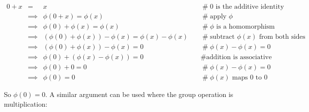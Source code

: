 \documentclass[11pt, oneside]{article}   	%
\theoremstyle{definition}
\begin{document}
\begin{equation*}
\begin{array}{rcll}
0 + x 
&=& x                                                                              &\quad \mathrel{\#} \text{$0$ is the additive identity}   \\
&\implies& \phi(0  + x) = \phi(x)                                      &\quad \mathrel{\#} \text{apply $\phi$}          \\
&\implies& \phi(0) +  \phi(x) = \phi(x)                              &\quad \mathrel{\#} \phi \text{ is a homomorphism}          \\
&\implies& (\phi(0) + \phi(x)) - \phi(x) = \phi(x) -\phi(x)   &\quad \mathrel{\#} \text{subtract $\phi(x)$ from both sides} \\
&\implies& (\phi(0) + \phi(x)) - \phi(x) = 0                       &\quad \mathrel{\#} \phi(x) -\phi(x) = 0 \\
&\implies& \phi(0) + (\phi(x) - \phi(x)) = 0                       &\quad \mathrel{\#} \text{addition is associative} \\
&\implies& \phi(0) + 0  = 0                                              &\quad \mathrel{\#} \phi(x) -\phi(x) = 0 \\
&\implies& \phi(0) = 0                                                     &\quad \mathrel{\#} \phi(x) \text{ maps $0$ to $0$}
\end{array}
\end{equation*}

\bigskip
\noindent
So $\phi(0) = 0$. A similar argument can be used where the group operation is multiplication:
\end{document}
